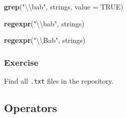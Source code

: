 \documentclass[]{book}
\newenvironment{Shaded}{\begin{snugshade}}{\end{snugshade}}
\newcommand{\CharTok}[1]{\textcolor[rgb]{0.31,0.60,0.02}{#1}}
\newcommand{\DataTypeTok}[1]{\textcolor[rgb]{0.13,0.29,0.53}{#1}}
\newcommand{\KeywordTok}[1]{\textcolor[rgb]{0.13,0.29,0.53}{\textbf{#1}}}
\newcommand{\NormalTok}[1]{#1}
\newcommand{\OtherTok}[1]{\textcolor[rgb]{0.56,0.35,0.01}{#1}}
\newcommand{\StringTok}[1]{\textcolor[rgb]{0.31,0.60,0.02}{#1}}
\theoremstyle{definition}
\theoremstyle{definition}
\theoremstyle{definition}
\theoremstyle{remark}
\begin{document}
\begin{Shaded}
\end{Shaded}

\begin{Shaded}
\begin{Highlighting}[]
\KeywordTok{grep}\NormalTok{(}\StringTok{"}\CharTok{\textbackslash{}\textbackslash{}}\StringTok{bab"}\NormalTok{, strings, }\DataTypeTok{value =} \OtherTok{TRUE}\NormalTok{)}
\end{Highlighting}
\end{Shaded}

\begin{Shaded}
\begin{Highlighting}[]
\KeywordTok{regexpr}\NormalTok{(}\StringTok{"}\CharTok{\textbackslash{}\textbackslash{}}\StringTok{bab"}\NormalTok{, strings)}
\end{Highlighting}
\end{Shaded}

\begin{Shaded}
\begin{Highlighting}[]
\KeywordTok{regexpr}\NormalTok{(}\StringTok{"}\CharTok{\textbackslash{}\textbackslash{}}\StringTok{Bab"}\NormalTok{, strings)}
\end{Highlighting}
\end{Shaded}

\hypertarget{exercise-1}{%
\subsubsection{Exercise}\label{exercise-1}}

Find all \texttt{.txt} files in the repository.

\hypertarget{operators}{%
\subsection{Operators}\label{operators}}
\end{document}
